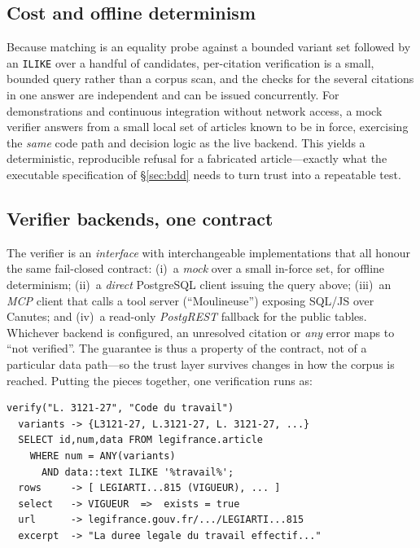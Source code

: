 \subsection{Cost and offline determinism}
Because matching is an equality probe against a bounded variant set followed by
an \texttt{ILIKE} over a handful of candidates, per-citation verification is a
small, bounded query rather than a corpus scan, and the checks for the several
citations in one answer are independent and can be issued concurrently. For
demonstrations and continuous integration without network access, a mock
verifier answers from a small local set of articles known to be in force,
exercising the \emph{same} code path and decision logic as the live backend.
This yields a deterministic, reproducible refusal for a fabricated
article---exactly what the executable specification of \S\ref{sec:bdd} needs to
turn trust into a repeatable test.

\subsection{Verifier backends, one contract}
\label{sec:verify-backends}
The verifier is an \emph{interface} with interchangeable implementations that
all honour the same fail-closed contract: (i)~a \emph{mock} over a small
in-force set, for offline determinism; (ii)~a \emph{direct} PostgreSQL client
issuing the query above; (iii)~an \emph{MCP} client that calls a tool server
(``Moulineuse'') exposing SQL/JS over Canutes; and (iv)~a read-only
\emph{PostgREST} fallback for the public tables. Whichever backend is
configured, an unresolved citation or \emph{any} error maps to ``not
verified''. The guarantee is thus a property of the contract, not of a
particular data path---so the trust layer survives changes in how the corpus is
reached. Putting the pieces together, one verification runs as:

\begin{lstlisting}[style=lr]
verify("L. 3121-27", "Code du travail")
  variants -> {L3121-27, L.3121-27, L. 3121-27, ...}
  SELECT id,num,data FROM legifrance.article
    WHERE num = ANY(variants)
      AND data::text ILIKE '%travail%';
  rows     -> [ LEGIARTI...815 (VIGUEUR), ... ]
  select   -> VIGUEUR  =>  exists = true
  url      -> legifrance.gouv.fr/.../LEGIARTI...815
  excerpt  -> "La duree legale du travail effectif..."
\end{lstlisting}
